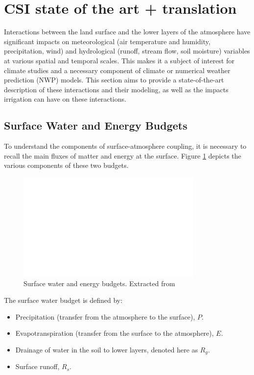 \section{CSI state of the art + translation}

Interactions between the land surface and the lower layers of the atmosphere have significant impacts on meteorological (air temperature and humidity, precipitation, wind) and hydrological (runoff, stream flow, soil moisture) variables at various spatial and temporal scales. This makes it a subject of interest for climate studies and a necessary component of climate or numerical weather prediction (NWP) models. This section aims to provide a state-of-the-art description of these interactions and their modeling, as well as the impacts irrigation can have on these interactions.

\subsection{Surface Water and Energy Budgets}

To understand the components of surface-atmosphere coupling, it is necessary to recall the main fluxes of matter and energy at the surface. 
Figure \ref{fig:budgets} depicts the various components of these two budgets.

\begin{figure}[ht]
    \centering
    \includegraphics[width=\textwidth]{images/budgets_seneviratne.png}
    \caption{Surface water and energy budgets. Extracted from \citet{seneviratne_investigating_2010}}
    \label{fig:budgets}
\end{figure}

The surface water budget is defined by:
\begin{itemize}
    \item Precipitation (transfer from the atmosphere to the surface), $P$.
    \item Evapotranspiration (transfer from the surface to the atmosphere), $E$.
    \item Drainage of water in the soil to lower layers, denoted here as $R_g$.
    \item Surface runoff, $R_s$.
\end{itemize}

